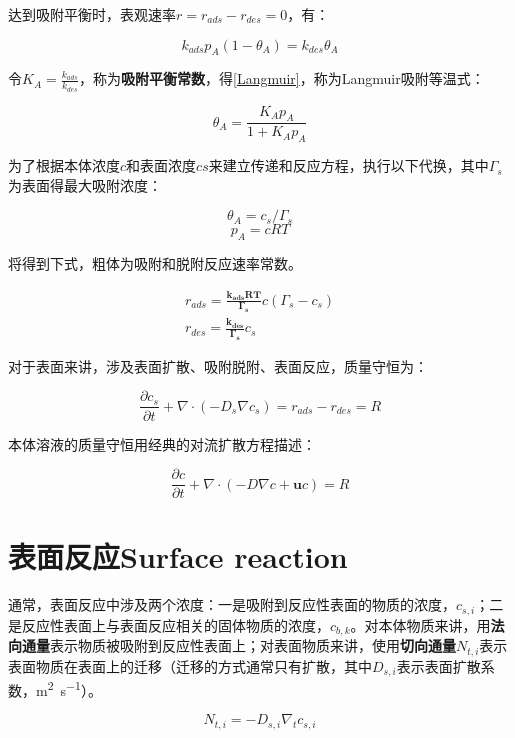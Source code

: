 达到吸附平衡时，表观速率$ r=r_{ads}-r_{des}=0 $，有：

\[k_{ads}p_A(1-\theta_A)=k_{des}\theta_A\]

令$ K_A=\frac{k_{ads}}{k_{des}} $，称为\textbf{吸附平衡常数}，得\autoref{Langmuir}，称为Langmuir吸附等温式：

\begin{equation}\label{Langmuir}
    \theta_A = \frac{K_Ap_A}{1+K_Ap_A}
\end{equation}

为了根据本体浓度$ c $和表面浓度$ cs $来建立传递和反应方程，执行以下代换，其中$ \Gamma_s $为表面得最大吸附浓度：

\[\theta_A = c_s/\Gamma_s\]
\[p_A=cRT\]

将得到下式，粗体为吸附和脱附反应速率常数。

\begin{gather}
    r_{ads} = \bm{\frac{k_{ads}RT}{\Gamma_s}}c(\Gamma_s-c_s)\\
    r_{des} = \bm{\frac{k_{des}}{\Gamma_s}}c_s
\end{gather}

对于表面来讲，涉及表面扩散、吸附脱附、表面反应，质量守恒为：

\begin{equation}
    \frac{\partial c_s}{\partial t}+\nabla\cdot(-D_s\nabla c_s) = r_{ads}-r_{des}=R
\end{equation}

本体溶液的质量守恒用经典的对流扩散方程描述：

\begin{equation}
    \frac{\partial c}{\partial t} + \nabla\cdot(-D\nabla c+\bm{u}c) = R
\end{equation}

\section{表面反应Surface reaction}

通常，表面反应中涉及两个浓度：一是吸附到反应性表面的物质的浓度，$ c_{s,i} $；二是反应性表面上与表面反应相关的固体物质的浓度，$ c_{b,k} $。对本体物质来讲，用\textbf{法向通量}表示物质被吸附到反应性表面上；对表面物质来讲，使用\textbf{切向通量}$ N_{t,i} $表示表面物质在表面上的迁移（迁移的方式通常只有扩散，其中$ D_{s,i} $表示表面扩散系数，\si{\meter\squared\per\second}）。

\begin{equation}
N_{t,i} = -D_{s,i}\nabla_t c_{s,i}
\end{equation}


